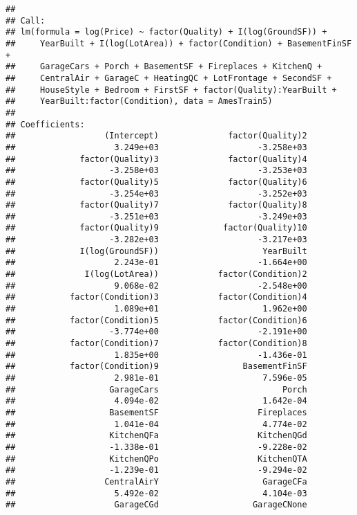 \documentclass[
]{article}
\begin{document}
\begin{verbatim}
## 
## Call:
## lm(formula = log(Price) ~ factor(Quality) + I(log(GroundSF)) + 
##     YearBuilt + I(log(LotArea)) + factor(Condition) + BasementFinSF + 
##     GarageCars + Porch + BasementSF + Fireplaces + KitchenQ + 
##     CentralAir + GarageC + HeatingQC + LotFrontage + SecondSF + 
##     HouseStyle + Bedroom + FirstSF + factor(Quality):YearBuilt + 
##     YearBuilt:factor(Condition), data = AmesTrain5)
## 
## Coefficients:
##                  (Intercept)              factor(Quality)2  
##                    3.249e+03                    -3.258e+03  
##             factor(Quality)3              factor(Quality)4  
##                   -3.258e+03                    -3.253e+03  
##             factor(Quality)5              factor(Quality)6  
##                   -3.254e+03                    -3.252e+03  
##             factor(Quality)7              factor(Quality)8  
##                   -3.251e+03                    -3.249e+03  
##             factor(Quality)9             factor(Quality)10  
##                   -3.282e+03                    -3.217e+03  
##             I(log(GroundSF))                     YearBuilt  
##                    2.243e-01                    -1.664e+00  
##              I(log(LotArea))            factor(Condition)2  
##                    9.068e-02                    -2.548e+00  
##           factor(Condition)3            factor(Condition)4  
##                    1.089e+01                     1.962e+00  
##           factor(Condition)5            factor(Condition)6  
##                   -3.774e+00                    -2.191e+00  
##           factor(Condition)7            factor(Condition)8  
##                    1.835e+00                    -1.436e-01  
##           factor(Condition)9                 BasementFinSF  
##                    2.981e-01                     7.596e-05  
##                   GarageCars                         Porch  
##                    4.094e-02                     1.642e-04  
##                   BasementSF                    Fireplaces  
##                    1.041e-04                     4.774e-02  
##                   KitchenQFa                    KitchenQGd  
##                   -1.338e-01                    -9.228e-02  
##                   KitchenQPo                    KitchenQTA  
##                   -1.239e-01                    -9.294e-02  
##                  CentralAirY                     GarageCFa  
##                    5.492e-02                     4.104e-03  
##                    GarageCGd                   GarageCNone  

\end{verbatim}
\end{document}
